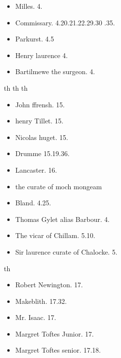 \documentclass[12pt, a4paper]{book}
\begin{document}
            		
            			\begin{itemize}
					\item[]Milles. 4.
					\item[]Commissary. 4.20.21.22.29.30
			.35.
					\item[]Parkurst. 4.5
					\item[]Henry laurence 4.
					\item[]Bartilmewe the surgeon. 4.
				\end{itemize}
            			th
            			th
            			th
            			\begin{itemize}
            				\item[]John ffrensh. 15.
            				\item[]henry Tillet. 15.
            				\item[]Nicolas huget. 15.
            				\item[]Drumme 15.19.36.
            				\item[]Lancaster. 16.
            				\item[]the curate of moch mongeam
            			\end{itemize}
			
			
				\begin{itemize}
					\item[]Bland. 4.25.
					\item[]Thomas Gylet alias Barbour. 4.
					\item[]The vicar of Chillam. 5.10.
					\item[]Sir laurence curate of Chalocke. 5.
				\end{itemize}
				th
				\begin{itemize}
					\item[]Robert Newington. 17.
					\item[]Makeblith. 17.32.
					\item[]Mr. Isaac. 17.
					\item[]Margret Toftes Junior. 17.
					\item[]Margret Toftes senior. 17.18.
				\end{itemize}
			
            		
				
				\marginpar[\vspace{0.5cm}{\textcolor{Gray}{th}}]{}
			
				
				\marginpar[\vspace{0.5cm}{\textcolor{Gray}{th}}]{}
			
\end{document}
